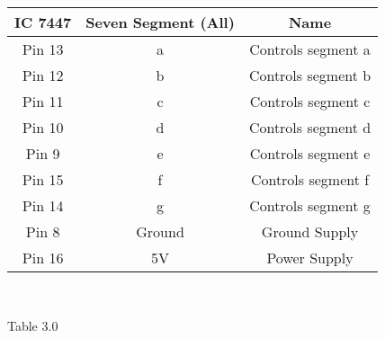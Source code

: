 \centering
\begin{tabular}{|c|c|c|}
\hline
IC 7447 & Seven Segment (All) & Name\\
\hline
Pin 13 & a & Controls segment a\\
\hline
Pin 12 & b & Controls segment b\\
\hline
Pin 11 & c & Controls segment c\\
\hline
Pin 10 & d & Controls segment d\\
\hline
Pin 9 & e & Controls segment e\\
\hline
Pin 15 & f & Controls segment f\\
\hline
Pin 14 & g & Controls segment g\\
\hline
Pin 8 & Ground & Ground Supply\\
\hline
Pin 16 & 5V & Power Supply\\
\hline
\end{tabular}\\
\centerline{Table 3.0}
